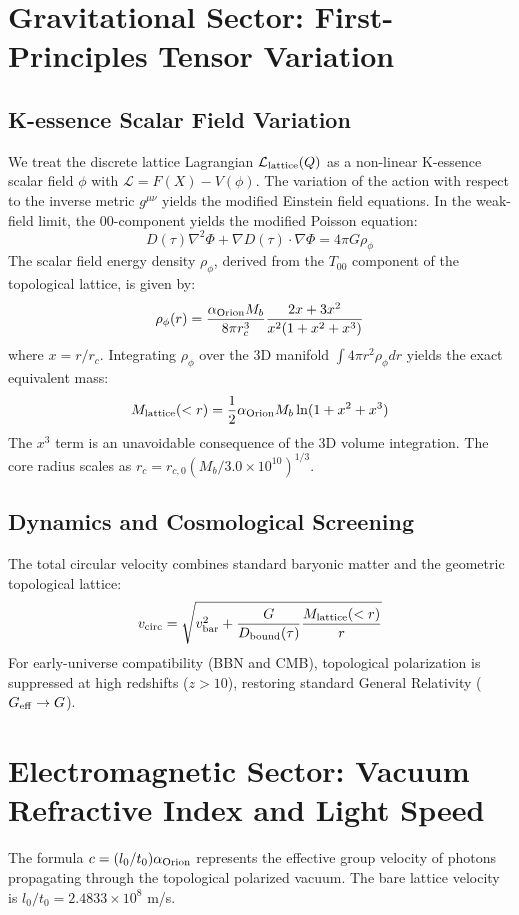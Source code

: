 \documentclass[twocolumn,aps,prd,superscriptaddress,nofootinbib]{revtex4-2}
\begin{document}
\section{Gravitational Sector: First-Principles Tensor Variation}
\subsection{K-essence Scalar Field Variation}
We treat the discrete lattice Lagrangian \(\mathcal{L}_{\rm lattice}(Q)\) as a non-linear K-essence scalar field \(\phi\) with \(\mathcal{L} = F(X) - V(\phi)\). The variation of the action with respect to the inverse metric \(g^{\mu\nu}\) yields the modified Einstein field equations. In the weak-field limit, the \(00\)-component yields the modified Poisson equation:
\begin{equation}
D(\tau) \nabla^2 \Phi + \nabla D(\tau) \cdot \nabla \Phi = 4\pi G \rho_\phi
\end{equation}
The scalar field energy density \(\rho_\phi\), derived from the \(T_{00}\) component of the topological lattice, is given by:
\begin{equation}
\rho_\phi(r) = \frac{\alpha_{\rm Orion} M_b}{8\pi r_c^3} \frac{2x + 3x^2}{x^2(1 + x^2 + x^3)}
\end{equation}
where \(x = r/r_c\). Integrating \(\rho_\phi\) over the 3D manifold \(\int 4\pi r^2 \rho_\phi dr\) yields the exact equivalent mass:
\begin{equation}
M_{\rm lattice}(<r) = \frac{1}{2} \alpha_{\rm Orion} M_b \ln(1 + x^2 + x^3)
\end{equation}
The \(x^3\) term is an unavoidable consequence of the 3D volume integration. The core radius scales as \(r_c = r_{c,0}(M_b/3.0\times10^{10})^{1/3}\).

\subsection{Dynamics and Cosmological Screening}
The total circular velocity combines standard baryonic matter and the geometric topological lattice:
\begin{equation}
v_{\rm circ} = \sqrt{ v_{\rm bar}^2 + \frac{G}{D_{\rm bound}(\tau)} \frac{M_{\rm lattice}(<r)}{r} }
\end{equation}
For early-universe compatibility (BBN and CMB), topological polarization is suppressed at high redshifts (\(z > 10\)), restoring standard General Relativity (\(G_{\rm eff} \to G\)).

\section{Electromagnetic Sector: Vacuum Refractive Index and Light Speed}
The formula \(c = (l_0/t_0) \alpha_{\rm Orion}\) represents the effective group velocity of photons propagating through the topological polarized vacuum. The bare lattice velocity is \(l_0/t_0 = 2.4833 \times 10^8\) m/s.
\end{document}
